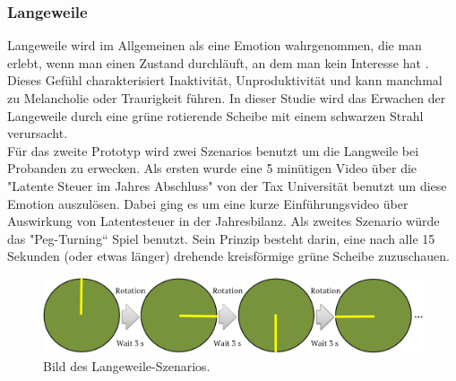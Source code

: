 \subsubsection{Langeweile} \label{langeweile-1}


Langeweile wird im Allgemeinen als eine Emotion wahrgenommen, die man erlebt, wenn man einen Zustand durchläuft, an dem man kein Interesse hat \cite{vodanovich_2003}. 
Dieses Gefühl charakterisiert Inaktivität, Unproduktivität und kann manchmal zu Melancholie oder Traurigkeit führen.
In dieser Studie wird das Erwachen der Langeweile durch eine grüne rotierende Scheibe mit einem schwarzen Strahl verursacht. \\

Für das zweite Prototyp wird zwei Szenarios benutzt um die Langweile bei Probanden zu erwecken.
Als ersten wurde eine 5 minütigen Video über die "Latente Steuer im Jahres Abschluss" von der Tax Universität benutzt um diese Emotion auszulösen. Dabei ging es um eine kurze Einführungsvideo über Auswirkung von Latentesteuer in der Jahresbilanz. 
Als zweites Szenario würde das "Peg-Turning“ Spiel benutzt. Sein Prinzip besteht darin, eine nach alle 15 Sekunden (oder etwas länger) drehende kreisförmige grüne Scheibe zuzuschauen.


\begin{figure}[H] \centering
\includegraphics[width=\textwidth]{Images/boredom_game2.png} 
\vspace{-0.3cm} 
\caption{Bild des Langeweile-Szenarios.}
\label{fig-glueck} 
\end{figure}

